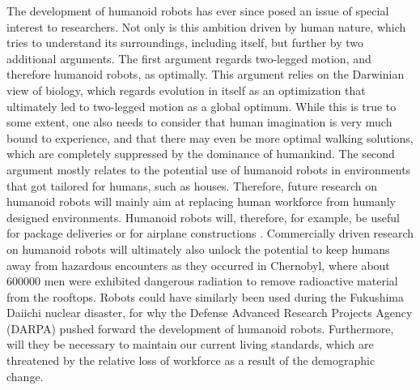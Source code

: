 \label{sec::1_in}
The development of humanoid robots has ever since posed an issue of special interest to researchers. Not only is this ambition driven by human nature, which tries to understand its surroundings, including itself, but further by two additional arguments. The first argument regards two-legged motion, and therefore humanoid robots, as optimally. This argument relies on the Darwinian view of biology, which regards evolution in itself as an optimization that ultimately led to two-legged motion as a global optimum. While this is true to some extent, one also needs to consider that human imagination is very much bound to experience, and that there may even be more optimal walking solutions, which are completely suppressed by the dominance of humankind. The second argument mostly relates to the potential use of humanoid robots in environments that got tailored for humans, such as houses. Therefore, future research on humanoid robots will mainly aim at replacing human workforce from humanly designed environments. Humanoid robots will, therefore, for example, be useful for package deliveries \cite{cassieford} or for airplane constructions \cite{stasse2014airbus}. Commercially driven research on humanoid robots will ultimately also unlock the potential to keep humans away from hazardous encounters as they occurred in Chernobyl, where about 600000 \cite{kinly2006chernobyl} men were exhibited dangerous radiation to remove radioactive material from the rooftops. Robots could have similarly been used during the Fukushima Daiichi nuclear disaster, for why the Defense Advanced Research Projects Agency (DARPA) pushed forward the development of humanoid robots. Furthermore, will they be necessary to maintain our current living standards, which are threatened by the relative loss of workforce as a result of the demographic change. \\\\
